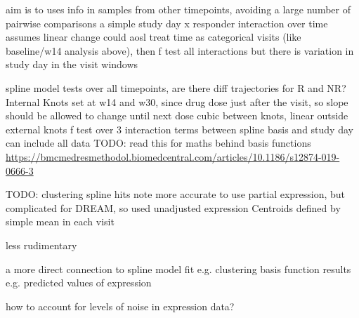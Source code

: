 \begin{outline}
\1 aim is to uses info in samples from other timepoints, avoiding a large number of pairwise comparisons
    \2 a simple study day x responder interaction over time assumes linear change
\1 could aosl treat time as categorical visits (like baseline/w14 analysis above), then f test all interactions
    \2 but there is variation in study day in the visit windows

\1 spline model tests over all timepoints, are there diff trajectories for R and NR?
    \2 Internal Knots set at w14 and w30, since drug dose just after the visit, so slope should be allowed to change until next dose
    \2 cubic between knots, linear outside external knots
    \2 f test over 3 interaction terms between spline basis and study day
        \3 can include all data
        \3 TODO: read this for maths behind basis functions \url{https://bmcmedresmethodol.biomedcentral.com/articles/10.1186/s12874-019-0666-3}



\1 TODO: clustering spline hits
    \2 note more accurate to use partial expression, but complicated for DREAM, so used unadjusted expression
    \2 Centroids defined by simple mean in each visit

less rudimentary

a more direct connection to spline model fit
e.g. clustering basis function results
e.g. predicted values of expression

how to account for levels of noise in expression data?


\end{outline}
